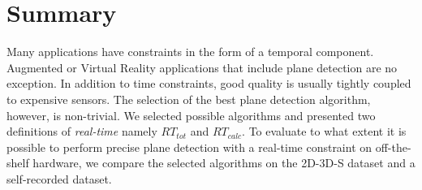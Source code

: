 \documentclass[main.tex]{subfiles}
\begin{document}

\section{Summary}
Many applications have constraints in the form of a temporal component. Augmented or Virtual Reality applications that include plane detection
are no exception. In addition to time constraints, good quality is usually tightly coupled to expensive sensors.
The selection of the best plane detection algorithm, however, is non-trivial. We selected possible algorithms and presented two definitions of \textit{real-time}
namely $RT_{tot}$ and $RT_{calc}$.
To evaluate to what extent it is possible to perform precise plane detection with a real-time constraint on off-the-shelf hardware,
we compare the selected algorithms on the 2D-3D-S dataset and a self-recorded dataset.
\end{document}
